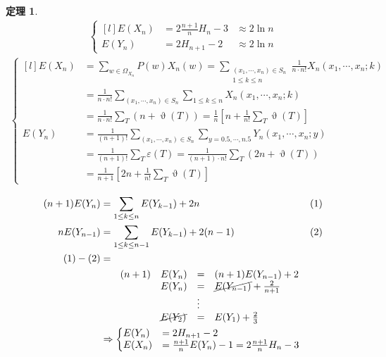 \documentclass[11pt,fleqn]{article}
\newtheorem{theorem}{定理}
\begin{document}
\begin{theorem}
\begin{align*}
	\left\{\begin{matrix*}[l]
		E(X_n) &= 2 \frac{n+1}{n} H_n - 3 &\approx 2 \ln n \\
		E(Y_n) &= 2 H_{n+1} - 2 &\approx 2 \ln n
	\end{matrix*}\right.
\end{align*}
\begin{align*}
	\left\{\begin{matrix*}[l]
		E(X_n) 
			&= \sum\limits_{w \in \Omega_{X_n} } P(w) X_n(w) 
				= \sum\limits_{
						\substack{
						(x_1, \cdots, x_n) \in S_n \\ 
						1 \le k \le n
						}} 
					\frac{1}{n \cdot n!} X_n (x_1, \cdots, x_n ; k) \\
			&= \frac{1}{n \cdot n!} 
				\sum\limits_{(x_1, \cdots, x_n) \in S_n} \sum\limits_{1 \le k \le n} 
					X_n (x_1, \cdots, x_n ; k) \\
			&= \frac{1}{n \cdot n!} \sum\limits_{T} \left(n + \upvartheta(T) \right) 
				= \frac{1}{n} 
					\left[ n + \frac{1}{n!} \sum\limits_{T} \upvartheta(T)\right]\\
		E(Y_n) 
			&= \frac{1}{(n+1)!} \sum\limits_{(x_1, \cdots, x_n) \in S_n}
					\sum\limits_{y = 0.5, \cdots, n.5} Y_n(x_1 , \cdots, x_n ; y) \\
			&= \frac{1}{(n+1)!} \sum\limits_{T} \varepsilon(T) 
				= \frac{1}{(n+1) \cdot n!} \sum\limits_{T} \left(2n + \upvartheta(T)\right) \\
			&= \frac{1}{n+1} \left[2n + \frac{1}{n!} \sum\limits_{T} \upvartheta(T)\right]
	\end{matrix*}\right.
\end{align*}
\end{theorem}

\begin{align*}
	(n+1) E(Y_n) &= \sum\limits_{1 \le k \le n} E(Y_{k-1}) + 2n 
		&& \text{(1)} \\
	n E(Y_{n-1}) &= \sum\limits_{1 \le k \le n-1} E(Y_{k-1}) + 2(n-1)
		&& \text{(2)} \\
	\text{(1)} - \text{(2)} &=\\
		& \qquad
		\begin{matrix*}[l]
		 	(n+1) &E(Y_n) &=& (n+1) E(Y_{n-1}) + 2 \\
			&E(Y_n) &=& \cancel{E(Y_{n-1})} + \frac{2}{n+1} \\
			& & \vdots &\\
			&\cancel{E(Y_2)} &=& E(Y_1) + \frac{2}{3}
		\end{matrix*} \\
	&\Rightarrow
		\left\{\begin{matrix*}[l]
			E(Y_n) &= 2 H_{n+1} - 2 \\
			E(X_n) &= \frac{n+1}{n} E(Y_{n}) - 1 = 2 \frac{n+1}{n} H_n - 3
		\end{matrix*}\right.
\end{align*}
\end{document}
